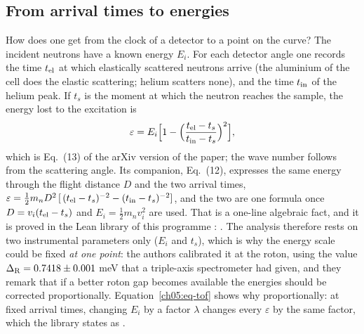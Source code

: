 \subsection*{From arrival times to energies}
How does one get from the clock of a detector to a point on the curve?
The incident neutrons have a known energy $E_i$.
For each detector angle one records the time $t_{\rm el}$ at which elastically scattered neutrons arrive (the aluminium of the cell does the elastic scattering; helium scatters none), and the time $t_{\rm in}$ of the helium peak.
If $t_s$ is the moment at which the neutron reaches the sample, the energy lost to the excitation is
\begin{equation}\label{ch05:eq-tof}
 \varepsilon = E_i\Bigl[1-\Bigl(\frac{t_{\rm el}-t_s}{t_{\rm in}-t_s}\Bigr)^{2}\Bigr],
\end{equation}
which is Eq.~(13) of the arXiv version of the paper; the wave number follows from the scattering angle.
Its companion, Eq.~(12), expresses the same energy through the flight distance $D$ and the two arrival times, $\varepsilon=\tfrac12 m_n D^2\,[\,(t_{\rm el}-t_s)^{-2}-(t_{\rm in}-t_s)^{-2}]$, and the two are one formula once $D=v_i(t_{\rm el}-t_s)$ and $E_i=\tfrac12 m_nv_i^2$ are used.
That is a one-line algebraic fact, and it is proved in the Lean library of this programme \cite{Callens2026lib}: .
The analysis therefore rests on two instrumental parameters only ($E_i$ and $t_s$), which is why the energy scale could be fixed \emph{at one point}: the authors calibrated it at the roton, using the value $\Delta_{\rm R}=0.7418\pm0.001$ meV that a triple-axis spectrometer had given, and they remark that if a better roton gap becomes available the energies should be corrected proportionally.
Equation~\eqref{ch05:eq-tof} shows why proportionally: at fixed arrival times, changing $E_i$ by a factor $\lambda$ changes every $\varepsilon$ by the same factor, which the library states as .

